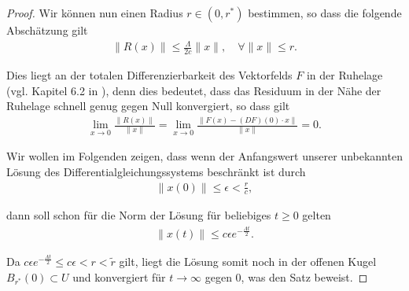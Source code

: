 \documentclass[letterpaper,10pt,german]{jupyterBook}
\begin{document}
\begin{proof}
\par
Wir können nun einen Radius \(r\in (0,{r^\ast})\) bestimmen, so dass die folgende Abschätzung gilt
\begin{align}\label{equation:odestability/ruhelagen:eq:residuum}
\|R(x)\| \leq \frac{\Lambda}{2c} \|x\|, \quad \forall \|x\| \leq r.
\end{align}
\par
Dies liegt an der totalen Differenzierbarkeit des Vektorfelds \(F\) in der Ruhelage (vgl. Kapitel 6.2 in \cite{Ten21}), denn dies bedeutet, dass das Residuum in der Nähe der Ruhelage schnell genug gegen Null konvergiert, so dass gilt
\begin{align*}
\lim_{x\to 0} \frac{\|R(x)\|}{\|x\|} = \lim_{x\to 0}\frac{\|F(x)- (DF)(0)\cdot x\|}{\|x\|} = 0.
\end{align*}
\par
Wir wollen im Folgenden zeigen, dass wenn der Anfangswert unserer unbekannten Lösung des Differentialgleichungssystems beschränkt ist durch
\begin{align*}
\|x(0)\| \leq \epsilon <\frac{r}{c},
\end{align*}
\par
dann soll schon für die Norm der Lösung für beliebiges \(t \geq 0\) gelten
\begin{align*}
\|x(t)\| \leq c\epsilon e^{-\frac{\Lambda t}{2}}.
\end{align*}
\par
Da \(c\epsilon e^{- \frac{\Lambda t}{2}} \leq c\epsilon < r <\tilde{r}\) gilt, liegt die Lösung somit noch in der offenen Kugel \(B_{{r^\ast}}(0) \subset U\) und konvergiert für \(t \rightarrow \infty\) gegen 0, was den Satz beweist.


\end{proof}
\end{document}
